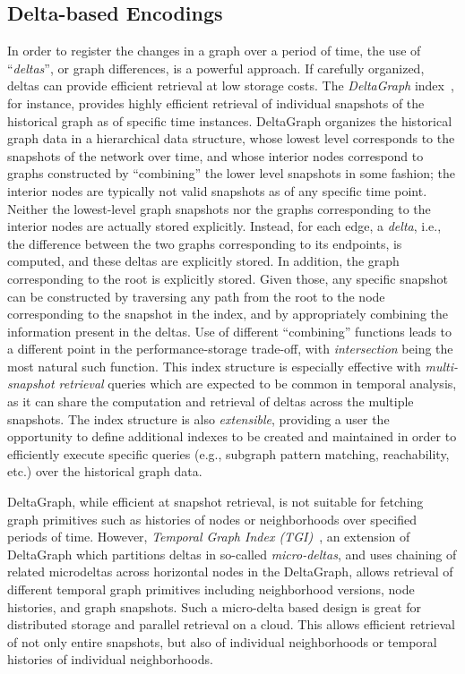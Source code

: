 \documentclass{svjour3}
\begin{document}
\subsection{Delta-based Encodings}
In order to register the changes in a graph over a period of time, the use of ``{\em deltas}'', or graph differences, is a powerful approach. If carefully organized, deltas can provide efficient retrieval at low storage costs. 
The {\em DeltaGraph} index~\cite{khurana2013efficient}, for instance, provides highly efficient retrieval of individual snapshots of the historical graph as of specific time instances. DeltaGraph organizes the historical graph data in a hierarchical data structure, whose lowest level corresponds
to the snapshots of the network over time, and whose interior nodes correspond to graphs constructed by ``combining''
the lower level snapshots in some fashion; the interior nodes are typically not valid snapshots as of any specific time point. Neither the lowest-level
graph snapshots nor the graphs corresponding to the interior nodes are actually stored explicitly. Instead, for each edge, a {\em delta}, i.e., the
difference between the two graphs corresponding to its endpoints, is computed, and these deltas are explicitly stored. In addition, the graph
corresponding to the root is explicitly stored. Given those, any specific snapshot can be constructed by traversing any
path from the root to the node corresponding to the snapshot in the index, and by appropriately combining the information present in the deltas.
Use of different ``combining'' functions leads to a different point in the performance-storage trade-off, with {\em intersection} being the most
natural such function.  This index structure is especially effective with {\em multi-snapshot retrieval} queries which are expected to be common in temporal 
analysis, as it can share the computation and retrieval of deltas across the multiple snapshots.
The index structure is also {\em extensible}, providing a user the opportunity to define additional 
indexes to be created and maintained in order to efficiently execute specific queries (e.g., subgraph pattern matching, reachability, etc.)
    over the historical graph data.

DeltaGraph, while efficient at snapshot retrieval, is not suitable for fetching graph primitives such as histories of nodes or neighborhoods over specified periods of time. However, {\em Temporal Graph Index (TGI)}~\cite{khurana2016storing}, an extension of DeltaGraph which partitions deltas in so-called {\em micro-deltas}, and uses chaining of related microdeltas across horizontal nodes in the DeltaGraph, allows retrieval of different temporal graph primitives including neighborhood versions, node histories, and graph snapshots. 
Such a micro-delta based design is great for distributed storage and parallel retrieval on a cloud. This allows efficient retrieval of not only
entire snapshots, but also of individual neighborhoods or temporal histories of individual neighborhoods.
\end{document}
